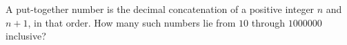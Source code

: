 A put-together number is the decimal concatenation of a positive integer $n$ and $n+1$, in that order. How many such numbers lie from $10$ through $1000000$ inclusive?
